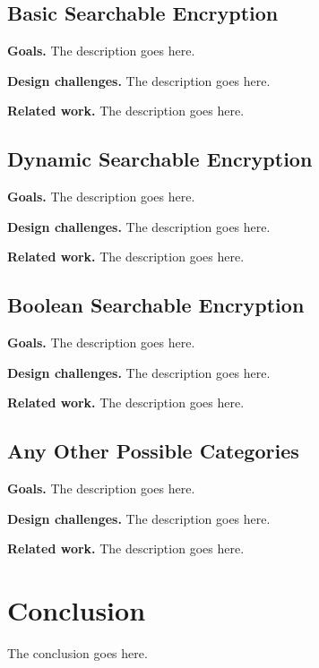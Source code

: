 \documentclass[conference]{IEEEtran}
\begin{document}
\subsection{Basic Searchable Encryption}

\textbf{Goals.} The description goes here.


\textbf{Design challenges.} The description goes here.

\textbf{Related work.} The description goes here.

\subsection{Dynamic Searchable Encryption}

\textbf{Goals.} The description goes here.


\textbf{Design challenges.} The description goes here.

\textbf{Related work.} The description goes here.




\subsection{Boolean Searchable Encryption}

\textbf{Goals.} The description goes here.


\textbf{Design challenges.} The description goes here.

\textbf{Related work.} The description goes here.

\subsection{Any Other Possible Categories}

\textbf{Goals.} The description goes here.


\textbf{Design challenges.} The description goes here.

\textbf{Related work.} The description goes here.

\section{Conclusion}

The conclusion goes here.




\end{document}
